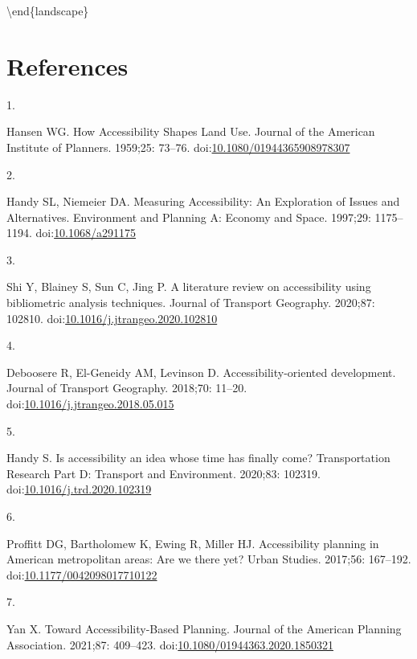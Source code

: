 \documentclass[10pt,letterpaper]{article}
\newlength{\cslhangindent}
\newlength{\csllabelwidth}
\newlength{\cslentryspacingunit} %
\newenvironment{CSLReferences}[2] %
 {%
  \setlength{\parindent}{0pt}
  \ifodd #1
  \let\oldpar\par
  \def\par{\hangindent=\cslhangindent\oldpar}
  \fi
  \setlength{\parskip}{#2\cslentryspacingunit}
 }%
 {}
\newcommand{\CSLLeftMargin}[1]{\parbox[t]{\csllabelwidth}{#1}}
\newcommand{\CSLRightInline}[1]{\parbox[t]{\linewidth - \csllabelwidth}{#1}\break}
\begin{document}
\textbackslash end\{landscape\}

\section{References}

\hypertarget{refs}{}
\begin{CSLReferences}{0}{0}
\leavevmode{}%
\CSLLeftMargin{1. }%
\CSLRightInline{Hansen WG. How Accessibility Shapes Land Use. Journal of
the American Institute of Planners. 1959;25: 73--76.
doi:\href{https://doi.org/10.1080/01944365908978307}{10.1080/01944365908978307}}

\leavevmode{}%
\CSLLeftMargin{2. }%
\CSLRightInline{Handy SL, Niemeier DA. Measuring {Accessibility}: {An}
{Exploration} of {Issues} and {Alternatives}. Environment and Planning
A: Economy and Space. 1997;29: 1175--1194.
doi:\href{https://doi.org/10.1068/a291175}{10.1068/a291175}}

\leavevmode{}%
\CSLLeftMargin{3. }%
\CSLRightInline{Shi Y, Blainey S, Sun C, Jing P. A literature review on
accessibility using bibliometric analysis techniques. Journal of
Transport Geography. 2020;87: 102810.
doi:\href{https://doi.org/10.1016/j.jtrangeo.2020.102810}{10.1016/j.jtrangeo.2020.102810}}

\leavevmode{}%
\CSLLeftMargin{4. }%
\CSLRightInline{Deboosere R, El-Geneidy AM, Levinson D.
Accessibility-oriented development. Journal of Transport Geography.
2018;70: 11--20.
doi:\href{https://doi.org/10.1016/j.jtrangeo.2018.05.015}{10.1016/j.jtrangeo.2018.05.015}}

\leavevmode{}%
\CSLLeftMargin{5. }%
\CSLRightInline{Handy S. Is accessibility an idea whose time has finally
come? Transportation Research Part D: Transport and Environment.
2020;83: 102319.
doi:\href{https://doi.org/10.1016/j.trd.2020.102319}{10.1016/j.trd.2020.102319}}

\leavevmode{}%
\CSLLeftMargin{6. }%
\CSLRightInline{Proffitt DG, Bartholomew K, Ewing R, Miller HJ.
Accessibility planning in American metropolitan areas: Are we there yet?
Urban Studies. 2017;56: 167--192.
doi:\href{https://doi.org/10.1177/0042098017710122}{10.1177/0042098017710122}}

\leavevmode{}%
\CSLLeftMargin{7. }%
\CSLRightInline{Yan X. Toward Accessibility-Based Planning. Journal of
the American Planning Association. 2021;87: 409--423.
doi:\href{https://doi.org/10.1080/01944363.2020.1850321}{10.1080/01944363.2020.1850321}}


\end{CSLReferences}
\end{document}
